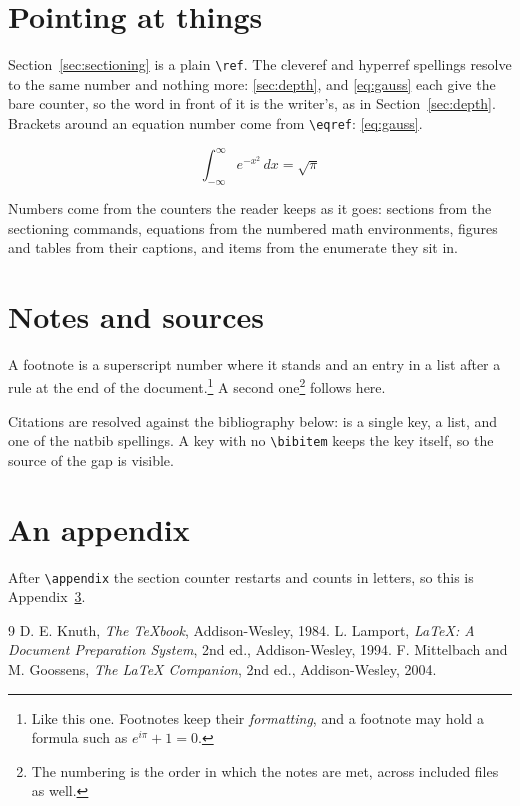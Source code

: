 \documentclass[11pt]{article}
\begin{document}


\section{Pointing at things}\label{sec:refs}
Section~\ref{sec:sectioning} is a plain \texttt{\textbackslash ref}. The
cleveref and hyperref spellings resolve to the same number and nothing more:
\autoref{sec:depth},  and \cref{eq:gauss} each give the
bare counter, so the word in front of it is the writer's, as in
Section~\ref{sec:depth}. Brackets around an equation number come from
\texttt{\textbackslash eqref}: \eqref{eq:gauss}.

\begin{equation}\label{eq:gauss}
  \int_{-\infty}^{\infty} e^{-x^2}\,dx = \sqrt{\pi}
\end{equation}

Numbers come from the counters the reader keeps as it goes: sections from
the sectioning commands, equations from the numbered math environments,
figures and tables from their captions, and items from the enumerate they
sit in.

\section{Notes and sources}
A footnote is a superscript number where it stands and an entry in a list
after a rule at the end of the document.\footnote{Like this one. Footnotes
keep their \emph{formatting}, and a footnote may hold a formula such as
$e^{i\pi} + 1 = 0$.} A second one\footnote{The numbering is the order in
which the notes are met, across included files as well.} follows here.

Citations are resolved against the bibliography below:
\cite{knuth84} is a single key, \cite{lamport94,mittelbach04} a list, and
\citep{knuth84} one of the natbib spellings. A key with no
\texttt{\textbackslash bibitem} keeps the key itself, so the source of the
gap is visible.

\appendix
\section{An appendix}\label{sec:appendix}
After \texttt{\textbackslash appendix} the section counter restarts and
counts in letters, so this is Appendix~\ref{sec:appendix}.

\begin{thebibliography}{9}
 D. E. Knuth, \emph{The \TeX book}, Addison-Wesley, 1984.
 L. Lamport, \emph{\LaTeX: A Document Preparation
  System}, 2nd ed., Addison-Wesley, 1994.
 F. Mittelbach and M. Goossens, \emph{The \LaTeX{}
  Companion}, 2nd ed., Addison-Wesley, 2004.
\end{thebibliography}
\end{document}
